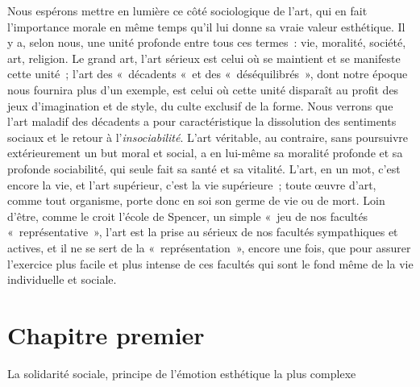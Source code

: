 \documentclass[french,twoside]{book} %
\newcommand\chapteropen{} %
\begin{document}
Nous espérons mettre en lumière ce côté sociologique de l’art, qui en fait l’importance morale en même temps qu’il lui donne sa vraie valeur esthétique. Il y a, selon nous, une unité profonde entre tous ces termes : vie, moralité, société, art, religion. Le grand art, l’art sérieux est celui où se maintient et se manifeste cette unité ; l’art des « décadents « et des « déséquilibrés », dont notre époque nous fournira plus d’un exemple, est celui où cette unité disparaît au profit des jeux d’imagination et de style, du culte exclusif de la forme. Nous verrons que l’art maladif des décadents a pour caractéristique la dissolution des sentiments sociaux et le retour à l’\emph{insociabilité}. L’art véritable, au contraire, sans poursuivre extérieurement un but moral et social, a en lui-même sa moralité profonde et sa profonde sociabilité, qui seule fait sa santé et sa vitalité. L’art, en un mot, c’est encore la vie, et l’art supérieur, c’est la vie supérieure ; toute œuvre d’art, comme tout organisme, porte donc en soi son germe de vie ou de mort. Loin d’être, comme le croit l’école de Spencer, un simple « jeu de nos facultés « représentative », l’art est la prise au sérieux de nos facultés sympathiques et actives, et il ne se sert de la « représentation », encore une fois, que pour assurer l’exercice plus facile et plus intense de ces facultés qui sont le fond même de la vie individuelle et sociale.

\chapteropen
\chapter[{Chapitre premier}]{Chapitre premier}\renewcommand{\leftmark}{Chapitre premier}

\begin{center}La solidarité sociale, principe de l’émotion esthétique la plus complexe\end{center}
\end{document}
